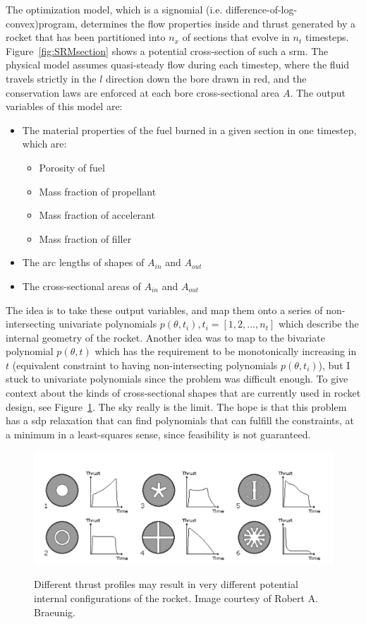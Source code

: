 The optimization model, which is a signomial (i.e. difference-of-log-convex)program, determines the
flow properties inside and thrust generated by a rocket that has
been partitioned into $n_x$ of sections that evolve in $n_t$ timesteps.
Figure~\ref{fig:SRMsection} shows a potential cross-section of such a \gls{srm}.
The physical model assumes quasi-steady flow during each timestep, where the fluid travels strictly
in the $l$ direction down the bore drawn in red, and the conservation laws are enforced at
each bore cross-sectional area $A$. The output variables of this model are:
\begin{itemize}
    \item The material properties of the fuel burned in a given section in one timestep, which are:
    \begin{itemize}
        \item Porosity of fuel
        \item Mass fraction of propellant
        \item Mass fraction of accelerant
        \item Mass fraction of filler
    \end{itemize}
    \item The arc lengths of shapes of $A_{in}$ and $A_{out}$
    \item The cross-sectional areas of $A_{in}$ and $A_{out}$
\end{itemize}

The idea is to take these output variables, and map them onto a series of
non-intersecting univariate polynomials $p(\theta, t_i), t_i = [1,2,...,n_t]$ which describe the internal geometry of the rocket.
Another idea was to map to the bivariate polynomial $p(\theta,t)$
which has the requirement to be monotonically increasing in $t$
(equivalent constraint to having non-intersecting polynomials $p(\theta, t_i)$),
but I stuck to univariate polynomials since the problem
was difficult enough.
To give context about the kinds of cross-sectional shapes that are currently used in rocket design,
see Figure~\ref{fig:potentialShapes}. The sky really is the limit.
The hope is that this problem has a \gls{sdp} relaxation that can find
polynomials that can fulfill the constraints, at a minimum in a least-squares sense,
since feasibility is not guaranteed.

\begin{figure}
    \begin{center}
        \includegraphics[width=0.7\linewidth]{figures/potentialShapes.png}
        \label{fig:potentialShapes}
        \caption{Different thrust profiles may result in very different potential internal configurations of the rocket.
        Image courtesy of Robert A. Braeunig.}
    \end{center}
\end{figure}
